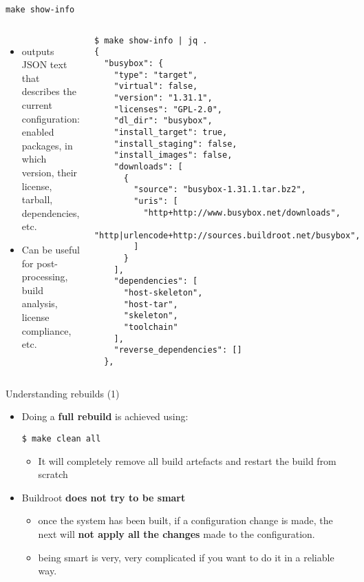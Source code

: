 \begin{frame}[fragile]{{\tt make show-info}}
  \begin{columns}
    \begin{itemize}
    \item {} outputs JSON text that describes the
      current configuration: enabled packages, in which version, their
      license, tarball, dependencies, etc.
    \item Can be useful for post-processing, build analysis, license
      compliance, etc.
    \end{itemize}

    \begin{block}{}
      {\tiny
\begin{verbatim}
$ make show-info | jq .
{
  "busybox": {
    "type": "target",
    "virtual": false,
    "version": "1.31.1",
    "licenses": "GPL-2.0",
    "dl_dir": "busybox",
    "install_target": true,
    "install_staging": false,
    "install_images": false,
    "downloads": [
      {
        "source": "busybox-1.31.1.tar.bz2",
        "uris": [
          "http+http://www.busybox.net/downloads",
          "http|urlencode+http://sources.buildroot.net/busybox",
        ]
      }
    ],
    "dependencies": [
      "host-skeleton",
      "host-tar",
      "skeleton",
      "toolchain"
    ],
    "reverse_dependencies": []
  },
\end{verbatim}
      }
    \end{block}
  \end{columns}
\end{frame}

\begin{frame}[fragile]{Understanding rebuilds (1)}
  \begin{itemize}
  \item Doing a {\bf full rebuild} is achieved using:
    \begin{block}{}
\begin{verbatim}
$ make clean all
\end{verbatim}
\end{block}
\begin{itemize}
\item It will completely remove all build artefacts and restart the
  build from scratch
\end{itemize}
  \item Buildroot {\bf does not try to be smart}
    \begin{itemize}
    \item once the system has been built, if a configuration change is
      made, the next  will {\bf not apply all the changes}
      made to the configuration.
    \item being smart is very, very complicated if you want to do it
      in a reliable way.
    \end{itemize}
  \end{itemize}
\end{frame}


